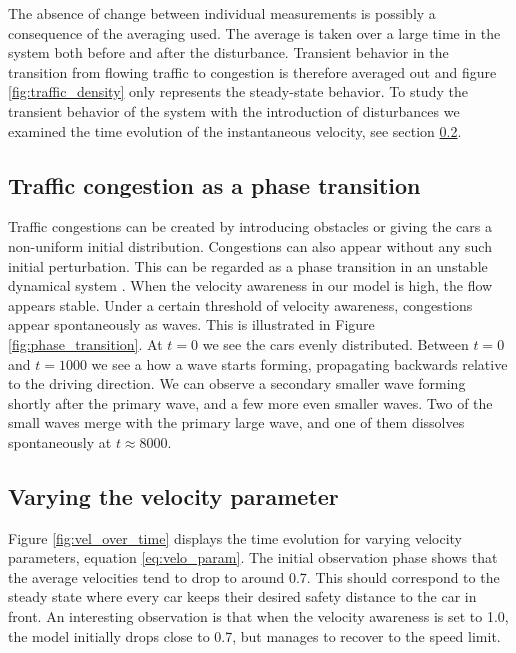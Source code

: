 \documentclass[11pt,a4paper,twocolumn]{article}
\begin{document}
 The absence of change between individual measurements is possibly a consequence of the averaging used. The average is taken over a large time in the system both before and after the disturbance. Transient behavior in the transition from flowing traffic to congestion is therefore averaged out and figure \ref{fig:traffic_density} only represents the steady-state behavior. To study the transient behavior of the system with the introduction of disturbances we examined the time evolution of the instantaneous velocity, see section \ref{sec:vel_param}. 

\subsection{Traffic congestion as a phase transition} \label{sec:phase}
Traffic congestions can be created by introducing obstacles or giving the cars a non-uniform initial distribution. Congestions can also appear without any such initial perturbation. This can be regarded as a phase transition in an unstable dynamical system \cite{bando1995dynamical}. When the velocity awareness in our model is high, the flow appears stable. Under a certain threshold of velocity awareness, congestions appear spontaneously as waves. This is illustrated in Figure \ref{fig:phase_transition}. At $t=0$ we see the cars evenly distributed. Between $t=0$ and $t=1000$ we see a how a wave starts forming, propagating backwards relative to the driving direction. We can observe a secondary smaller wave forming shortly after the primary wave, and a few more even smaller waves. Two of the small waves merge with the primary large wave, and one of them dissolves spontaneously at $t \approx 8000$. 

\subsection{Varying the velocity parameter}\label{sec:vel_param}
Figure \ref{fig:vel_over_time} displays the time evolution for varying velocity parameters, equation \eqref{eq:velo_param}. The initial observation phase shows that the average velocities tend to drop to around 0.7.
This should correspond to the steady state where every car keeps their desired safety distance to the car in front.%
An interesting observation is that when the velocity awareness is set to 1.0, the model initially drops close to 0.7, but manages to recover to the speed limit. %
\end{document}
